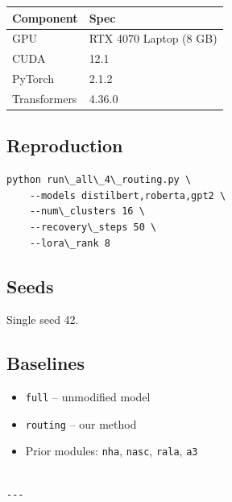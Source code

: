 \begin{table}[H]
\centering
\small
\begin{tabular}{ll}
\toprule
\textbf{Component} & \textbf{Spec} \\
\midrule
GPU & RTX 4070 Laptop (8 GB) \\
CUDA & 12.1 \\
PyTorch & 2.1.2 \\
Transformers & 4.36.0 \\
\bottomrule
\end{tabular}
\end{table}

\subsection{Reproduction}

\begin{lstlisting}
python run\_all\_4\_routing.py \
    --models distilbert,roberta,gpt2 \
    --num\_clusters 16 \
    --recovery\_steps 50 \
    --lora\_rank 8
\end{lstlisting}

\subsection{Seeds}

Single seed 42.

\subsection{Baselines}

\begin{itemize}
\item \texttt{full} -- unmodified model
\item \texttt{routing} -- our method
\item Prior modules: \texttt{nha}, \texttt{nasc}, \texttt{rala}, \texttt{a3}
\end{itemize}
\begin{lstlisting}

---
\end{lstlisting}